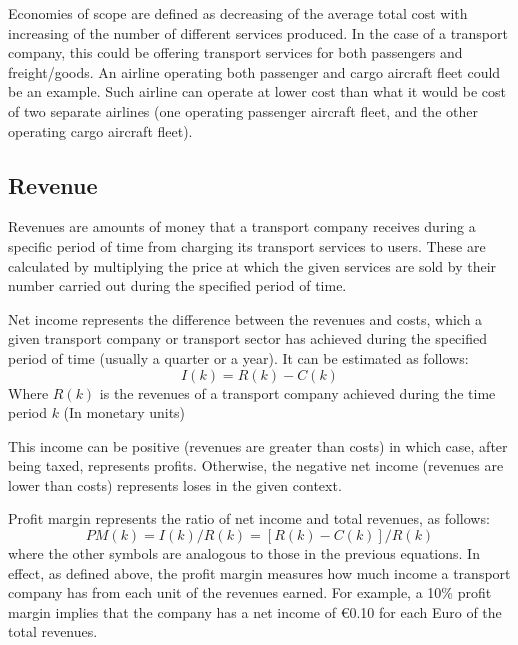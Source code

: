 \par
Economies of scope are defined as decreasing of the average total cost with increasing of the number of different services produced. In the case of a transport company, this could be offering transport services for both passengers and freight/goods. An airline operating both passenger and cargo aircraft fleet could be an example. Such airline can operate at lower cost than what it would be cost of two separate airlines (one operating passenger aircraft fleet, and the other operating cargo aircraft fleet).\\
\par
\subsection{Revenue}
Revenues are amounts of money that a transport company receives during a specific period of time from charging its transport services to users. These are calculated by multiplying the price at which the given services are sold by their number carried out during the specified period of time.\\
\par
Net income represents the difference between the revenues and costs, which a given transport company or transport sector has achieved during the specified period of time (usually a quarter or a year). It can be estimated as follows:
\begin{equation}
	I(k) = R(k) - C(k)
\end{equation}
%
Where $R(k)$ is the revenues of a transport company achieved during the time period $k$ (In monetary units)\\
\par
This income can be positive (revenues are greater than costs) in which case, after being taxed, represents profits. Otherwise, the negative net income (revenues are lower than costs) represents loses in the given context.\\
\par
Profit margin represents the ratio of net income and total revenues, as follows:\\
\begin{equation}
	PM(k) = I(k)/R(k) = [R(k) - C(k)]/R(k)
\end{equation}
where the other symbols are analogous to those in the previous equations. In effect, as defined above, the profit margin measures how much income a transport company has from each unit of the revenues earned. For example, a 10\% profit margin implies that the company has a net income of €0.10 for each Euro of the total revenues.\\
